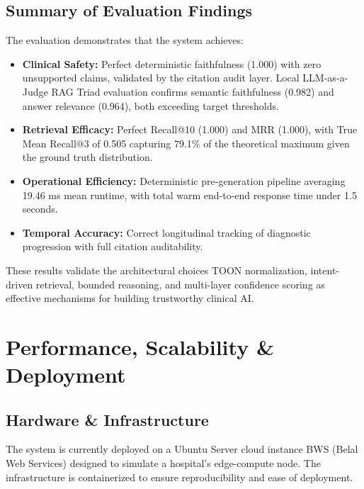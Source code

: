 \subsection{Summary of Evaluation Findings}
The evaluation demonstrates that the system achieves:
\begin{itemize}
    \item \textbf{Clinical Safety:} Perfect deterministic faithfulness (1.000) with zero unsupported claims, validated by the citation audit layer. Local LLM-as-a-Judge RAG Triad evaluation confirms semantic faithfulness (0.982) and answer relevance (0.964), both exceeding target thresholds.
    \item \textbf{Retrieval Efficacy:} Perfect Recall@10 (1.000) and MRR (1.000), with True Mean Recall@3 of 0.505 capturing 79.1\% of the theoretical maximum given the ground truth distribution.
    \item \textbf{Operational Efficiency:} Deterministic pre-generation pipeline averaging 19.46 ms mean runtime, with total warm end-to-end response time under 1.5 seconds.
    \item \textbf{Temporal Accuracy:} Correct longitudinal tracking of diagnostic progression with full citation auditability.
\end{itemize}

These results validate the architectural choices TOON normalization, intent-driven retrieval, bounded reasoning, and multi-layer confidence scoring as effective mechanisms for building trustworthy clinical AI.


\section{Performance, Scalability \& Deployment}
\label{sec:performance}

\subsection{Hardware \& Infrastructure}
The system is currently deployed on a Ubuntu Server cloud instance BWS (Belal Web Services) designed to simulate a hospital's edge-compute node. The infrastructure is containerized to ensure reproducibility and ease of deployment.

